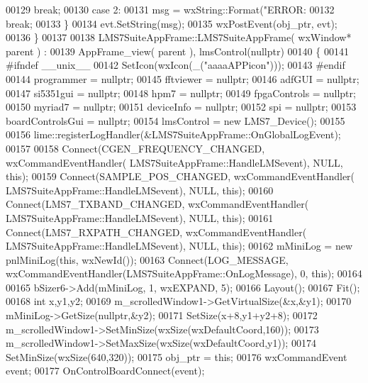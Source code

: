 \begin{DoxyCode}
{{00129         \textcolor{keywordflow}{break};
00130     \textcolor{keywordflow}{case} 2:
00131         msg = wxString::Format(\textcolor{stringliteral}{"ERROR: %
00132         \textcolor{keywordflow}{break};
00133     \}
00134     evt.SetString(msg);
00135     wxPostEvent(obj\_ptr, evt);
00136 \}
00137 
00138 LMS7SuiteAppFrame::LMS7SuiteAppFrame( wxWindow* parent ) :
00139     AppFrame_view( parent ), lmsControl(nullptr)
00140 \{
00141 \textcolor{preprocessor}{#ifndef \_\_unix\_\_}
00142     SetIcon(wxIcon(\_(\textcolor{stringliteral}{"aaaaAPPicon"})));
00143 \textcolor{preprocessor}{#endif}
00144     programmer = \textcolor{keyword}{nullptr};
00145     fftviewer = \textcolor{keyword}{nullptr};
00146     adfGUI = \textcolor{keyword}{nullptr};
00147     si5351gui = \textcolor{keyword}{nullptr};
00148     hpm7 = \textcolor{keyword}{nullptr};
00149     fpgaControls = \textcolor{keyword}{nullptr};
00150     myriad7 = \textcolor{keyword}{nullptr};
00151     deviceInfo = \textcolor{keyword}{nullptr};
00152     spi = \textcolor{keyword}{nullptr};
00153     boardControlsGui = \textcolor{keyword}{nullptr};
00154     lmsControl = \textcolor{keyword}{new} LMS7_Device();
00155 
00156     lime::registerLogHandler(&LMS7SuiteAppFrame::OnGlobalLogEvent);
00157 
00158     Connect(CGEN\_FREQUENCY\_CHANGED, wxCommandEventHandler(
      LMS7SuiteAppFrame::HandleLMSevent), NULL, \textcolor{keyword}{this});
00159     Connect(SAMPLE\_POS\_CHANGED, wxCommandEventHandler(
      LMS7SuiteAppFrame::HandleLMSevent), NULL, \textcolor{keyword}{this});
00160     Connect(LMS7\_TXBAND\_CHANGED, wxCommandEventHandler(
      LMS7SuiteAppFrame::HandleLMSevent), NULL, \textcolor{keyword}{this});
00161     Connect(LMS7\_RXPATH\_CHANGED, wxCommandEventHandler(
      LMS7SuiteAppFrame::HandleLMSevent), NULL, \textcolor{keyword}{this});
00162     mMiniLog = \textcolor{keyword}{new} pnlMiniLog(\textcolor{keyword}{this}, wxNewId());
00163     Connect(LOG\_MESSAGE, wxCommandEventHandler(LMS7SuiteAppFrame::OnLogMessage), 0, \textcolor{keyword}{this});
00164 
00165     bSizer6->Add(mMiniLog, 1, wxEXPAND, 5);
00166     Layout();
00167     Fit();
00168     \textcolor{keywordtype}{int} x,y1,y2;
00169     m_scrolledWindow1->GetVirtualSize(&x,&y1);
00170     mMiniLog->GetSize(\textcolor{keyword}{nullptr},&y2);
00171     SetSize(x+8,y1+y2+8);
00172     m_scrolledWindow1->SetMinSize(wxSize(wxDefaultCoord,160));
00173     m_scrolledWindow1->SetMaxSize(wxSize(wxDefaultCoord,y1));
00174     SetMinSize(wxSize(640,320));
00175     obj_ptr = \textcolor{keyword}{this};
00176     wxCommandEvent event;
00177     OnControlBoardConnect(event);
}}}
\end{DoxyCode}
